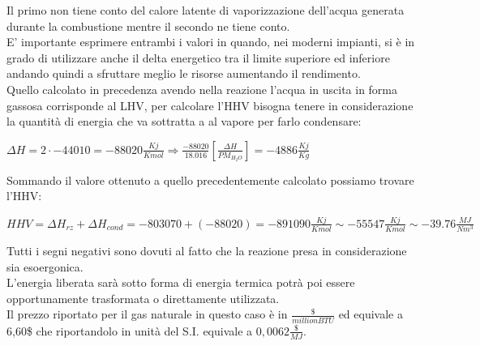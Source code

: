 \smallskip
\noindent
Il primo non tiene conto del calore latente di vaporizzazione dell'acqua generata durante la combustione mentre il secondo ne tiene conto.\\
E' importante esprimere entrambi i valori in quando, nei moderni impianti, si è in grado di utilizzare anche il delta energetico tra il limite superiore ed inferiore andando quindi a sfruttare meglio le risorse aumentando il rendimento.\\
Quello calcolato in precedenza avendo nella reazione l'acqua in uscita in forma gassosa corrisponde al LHV, per calcolare l'HHV bisogna tenere in considerazione la quantità di energia che va sottratta a al vapore per farlo condensare:
\begin{center}
    \large{$\Delta H = 2 \cdot -44010 = -88020 \frac{Kj}{Kmol} \Rightarrow \frac{-88020}{18.016}[\frac{\Delta H}{PM_{H_2O}}] = -4886 \frac{Kj}{Kg}$}
\end{center}
Sommando il valore ottenuto a quello precedentemente calcolato possiamo trovare l'HHV:
\begin{center}
    \normalsize{$HHV = \Delta H_{rz} + \Delta H_{cond} = -803070 + (-88020) = -891090 \frac{Kj}{Kmol}\sim -55547 \frac{Kj}{Kmol} \sim -39.76 \frac{MJ}{Nm^3}$}
\end{center}
Tutti i segni negativi sono dovuti al fatto che la reazione presa in considerazione sia esoergonica.\\
L'energia liberata sarà sotto forma di energia termica potrà poi essere opportunamente trasformata o direttamente utilizzata.\\
Il prezzo riportato per il gas naturale in questo caso è in $\frac{\$}{million BTU}$ ed equivale a 6,60\$ che riportandolo in unità del S.I. equivale a $0,0062\frac{\$}{MJ}$.\\
